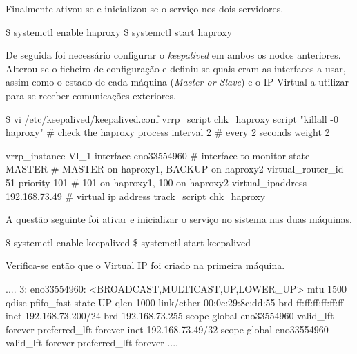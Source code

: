 Finalmente ativou-se e inicializou-se o serviço nos dois servidores.

\begin{MyVerbatims}
  \$ systemctl enable haproxy
  \$ systemctl start haproxy
\end{MyVerbatims}

De seguida foi necessário configurar o \textit{keepalived} em ambos os nodos anteriores. Alterou-se o ficheiro de configuração e definiu-se quais eram as interfaces a usar, assim como o estado de cada máquina (\textit{Master or Slave}) e o IP Virtual a utilizar para se receber comunicações exteriores.

\begin{MyVerbatims}
  \$ vi /etc/keepalived/keepalived.conf
    vrrp_script chk_haproxy {
      script "killall -0 haproxy" # check the haproxy process
      interval 2 # every 2 seconds
      weight 2
    }

    vrrp_instance VI_1 {
      interface eno33554960 # interface to monitor
      state MASTER # MASTER on haproxy1, BACKUP on haproxy2
      virtual_router_id 51
      priority 101 # 101 on haproxy1, 100 on haproxy2
      virtual_ipaddress {
        192.168.73.49 # virtual ip address
      }
      track_script {
        chk_haproxy
      }
    }
\end{MyVerbatims}

A questão seguinte foi ativar e inicializar o serviço no sistema nas duas máquinas.

\begin{MyVerbatims}
  \$ systemctl enable keepalived
  \$ systemctl start keepalived
\end{MyVerbatims}

Verifica-se então que o Virtual IP foi criado na primeira máquina.

\begin{MyVerbatims}
  ....
  3: eno33554960: <BROADCAST,MULTICAST,UP,LOWER_UP> mtu 1500 qdisc pfifo_fast state UP qlen 1000
    link/ether 00:0c:29:8c:dd:55 brd ff:ff:ff:ff:ff:ff
    inet 192.168.73.200/24 brd 192.168.73.255 scope global eno33554960
       valid_lft forever preferred_lft forever
    inet 192.168.73.49/32 scope global eno33554960
       valid_lft forever preferred_lft forever
  ....
\end{MyVerbatims}
